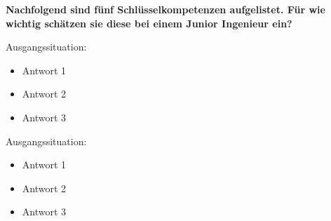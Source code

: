 \documentclass{article}
\begin{document}
 


\textbf{Nachfolgend sind fünf Schlüsselkompetenzen aufgelistet. Für wie wichtig schätzen sie diese bei einem Junior Ingenieur ein?}

\hspace{2cm}

Ausgangssituation: 

\begin{itemize}[label={\Square}] 
\item Antwort 1 
\item Antwort 2 
\item Antwort 3 
\end{itemize} 
\bigskip 

Ausgangssituation: 

\begin{itemize}[label={\Square}] 
\item Antwort 1 
\item Antwort 2 
\item Antwort 3 
\end{itemize} 
\bigskip 
\end{document}
